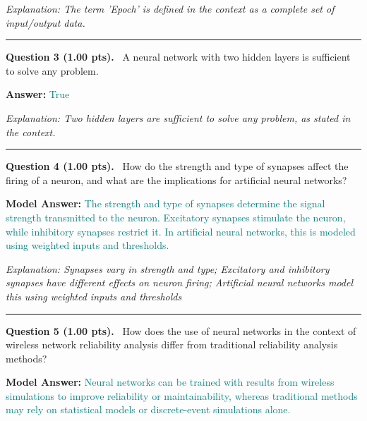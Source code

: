 \documentclass[12pt,a4paper]{article}
\begin{document}
\textit{\small Explanation: The term 'Epoch' is defined in the context as a complete set of input/output data.}



\vspace{0.8em}
\noindent\rule{\linewidth}{0.2pt}
\vspace{0.3em}


\noindent
\textbf{Question 3 (1.00 pts).}~
A neural network with two hidden layers is sufficient to solve any problem.


\textbf{Answer:} \textcolor{teal}{True}



\textit{\small Explanation: Two hidden layers are sufficient to solve any problem, as stated in the context.}



\vspace{0.8em}
\noindent\rule{\linewidth}{0.2pt}
\vspace{0.3em}


\noindent
\textbf{Question 4 (1.00 pts).}~
How do the strength and type of synapses affect the firing of a neuron, and what are the implications for artificial neural networks?


\textbf{Model Answer:} \textcolor{teal}{The strength and type of synapses determine the signal strength transmitted to the neuron. Excitatory synapses stimulate the neuron, while inhibitory synapses restrict it. In artificial neural networks, this is modeled using weighted inputs and thresholds.}



\textit{\small Explanation: Synapses vary in strength and type; Excitatory and inhibitory synapses have different effects on neuron firing; Artificial neural networks model this using weighted inputs and thresholds}



\vspace{0.8em}
\noindent\rule{\linewidth}{0.2pt}
\vspace{0.3em}


\noindent
\textbf{Question 5 (1.00 pts).}~
How does the use of neural networks in the context of wireless network reliability analysis differ from traditional reliability analysis methods?


\textbf{Model Answer:} \textcolor{teal}{Neural networks can be trained with results from wireless simulations to improve reliability or maintainability, whereas traditional methods may rely on statistical models or discrete-event simulations alone.}
\end{document}
